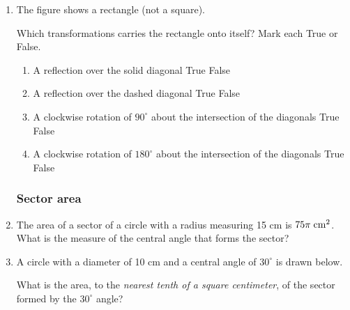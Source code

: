 \documentclass[12pt, oneside]{article}
\begin{document}
\begin{enumerate}[itemsep=0cm]
\item The figure shows a rectangle (not a square).
  \begin{center}
  \end{center}
  Which transformations carries the rectangle onto itself? Mark each True or False.
    \begin{enumerate}
      \item A reflection over the solid diagonal \hfill True \quad False
      \item A reflection over the dashed diagonal \hfill True \quad False
      \item A clockwise rotation of $90^\circ$ about the intersection of the diagonals \hfill True \quad False
      \item A clockwise rotation of $180^\circ$ about the intersection of the diagonals \hfill True \quad False
    \end{enumerate}

\subsubsection*{Sector area}
\item The area of a sector of a circle with a radius measuring 15 cm is $75\pi \; \rm{cm}^2$. What is the measure of the central angle that forms the sector?

\item A circle with a diameter of 10 cm and a central angle of $30^\circ$ is drawn below.
\begin{center}
  \end{center}
  What is the area, to the \emph{nearest tenth of a square centimeter}, of the sector formed by the $30^\circ$ angle?


\end{enumerate}
\end{document}
